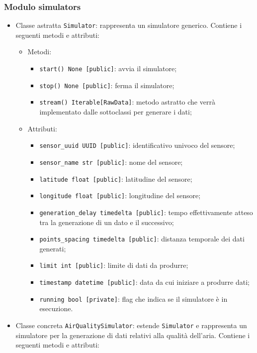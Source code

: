 \subsubsection{Modulo simulators}
\begin{itemize}
	\item Classe astratta \texttt{Simulator}: rappresenta un simulatore generico. Contiene i seguenti metodi e attributi:
	      \begin{itemize}
		      \item Metodi:
		            \begin{itemize}
			            \item \texttt{start() None [public]}: avvia il simulatore;
			            \item \texttt{stop() None [public]}: ferma il simulatore;
			            \item \texttt{stream() Iterable[RawData]}: metodo astratto che verrà implementato dalle sottoclassi per generare i dati;
		            \end{itemize}
		      \item Attributi:
		            \begin{itemize}
			            \item \texttt{sensor\_uuid UUID [public]}: identificativo univoco del sensore;
			            \item \texttt{sensor\_name str [public]}: nome del sensore;
			            \item \texttt{latitude float [public]}: latitudine del sensore;
			            \item \texttt{longitude float [public]}: longitudine del sensore;
			            \item \texttt{generation\_delay timedelta [public]}: tempo effettivamente atteso tra la generazione di un dato e il successivo;
			            \item \texttt{points\_spacing timedelta [public]}: distanza temporale dei dati generati;
			            \item \texttt{limit int [public]}: limite di dati da produrre;
			            \item \texttt{timestamp datetime [public]}: data da cui iniziare a produrre dati;
			            \item \texttt{running bool [private]}: flag che indica se il simulatore è in esecuzione.
		            \end{itemize}
	      \end{itemize}
	\item Classe concreta \texttt{AirQualitySimulator}: estende \texttt{Simulator} e rappresenta un simulatore per la generazione di dati relativi alla qualità dell'aria. Contiene i seguenti metodi e attributi:

\end{itemize}
